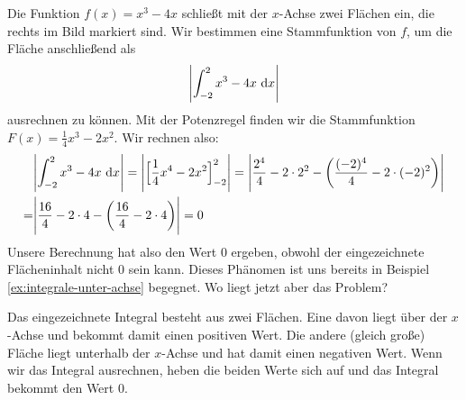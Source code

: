 \documentclass[../../main.tex]{subfiles}
\begin{document}
\begin{example}{}
    Die Funktion $f(x)=x^3-4x$ schließt mit der $x$-Achse zwei Flächen ein, die rechts im Bild markiert sind. Wir bestimmen
    eine Stammfunktion von $f$, um die Fläche anschließend als
    \[\Biggl|\int_{-2}^2x^3-4x\mathop{}\mathrm{d} x\Biggr|\]
    ausrechnen zu können. Mit der Potenzregel finden wir die Stammfunktion $F(x)=\frac{1}{4}x^3-2x^2$. Wir rechnen also:
    \begin{align*}
        &\Biggl|\int_{-2}^2x^3-4x\mathop{}\mathrm{d} x\Biggr|=\Biggl|\Bigl[\frac{1}{4}x^4-2x^2\Bigr]_{-2}^2\Biggr|=\Biggl|\frac{2^4}{4}-2\cdot 2^2-\biggl(\frac{(-2)^4}{4}-2\cdot (-2)^2\biggr)\Biggr|\\
        =&\Biggl|\frac{16}{4}-2\cdot 4-\biggl(\frac{16}{4}-2\cdot 4\biggr)\Biggr|=0
    \end{align*}
    Unsere Berechnung hat also den Wert 0 ergeben, obwohl der eingezeichnete Flächeninhalt nicht 0 sein kann.
    Dieses Phänomen ist uns bereits in Beispiel \ref{ex:integrale-unter-achse} begegnet. Wo liegt jetzt aber das Problem?

    Das eingezeichnete Integral besteht aus zwei Flächen. Eine davon liegt über der $x$-Achse und bekommt damit einen
    positiven Wert. Die andere (gleich große) Fläche liegt unterhalb der $x$-Achse und hat damit einen negativen
    Wert. Wenn wir das Integral ausrechnen, heben die beiden Werte sich auf und das Integral bekommt den Wert 0.
\end{example}
\end{document}
